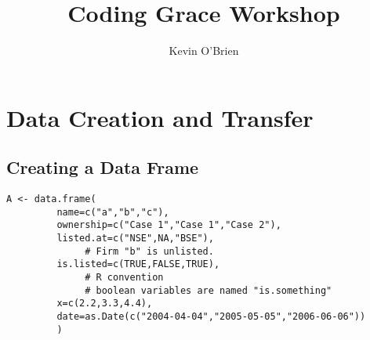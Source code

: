 \documentclass[12pt, a4paper]{article}
\author{ }
\theoremstyle{plain}
\theoremstyle{definition}
\theoremstyle{remark}
\begin{document}
\author{Kevin O'Brien}
\title{Coding Grace Workshop}
\maketitle

\newpage
\section{Data Creation and Transfer}

\subsection{Creating a Data Frame}
\begin{framed}
\begin{verbatim}
A <- data.frame(
         name=c("a","b","c"),
         ownership=c("Case 1","Case 1","Case 2"),
         listed.at=c("NSE",NA,"BSE"),
              # Firm "b" is unlisted.
         is.listed=c(TRUE,FALSE,TRUE),
              # R convention
              # boolean variables are named "is.something"
         x=c(2.2,3.3,4.4),
         date=as.Date(c("2004-04-04","2005-05-05","2006-06-06"))
         )
\end{verbatim}
\end{framed}
\end{document}
